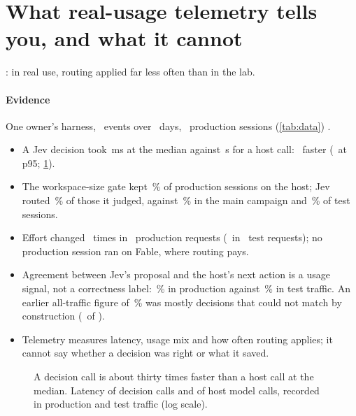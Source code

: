\section{What real-usage telemetry tells you, and what it cannot}\label{sec:telemetry}

\begin{claimbox}
: in real use, routing applied far less often than in the lab.
\end{claimbox}

\paragraph{Evidence} One owner's harness, \ObEvents\ events over \ObDays\ days, \ObProdSessions\ production sessions
(\cref{tab:data}) \expl.
\begin{itemize}[leftmargin=1.2em]
  \item A Jev decision took \ObJevPfifty\,ms at the median against \ObHostPfifty\,s for a host call: \ObJevHostXFifty\X\
    faster (\ObJevHostXNinetyfive\X\ at p95; \cref{fig:latency}).
  \item The workspace-size gate kept \ObStScopePct\,\% of production sessions on the host; Jev routed \ObJevRouteProd\,\%
    of those it judged, against \AoFableJevRoute\,\% in the main campaign and \ObJevRouteTest\,\% of test sessions.
  \item Effort changed \ObEffSwitchProd\ times in \ObEffReqProd\ production requests (\ObEffSwitchTest\ in \ObEffReqTest\
    test requests); no production session ran on Fable, where routing pays.
  \item Agreement between Jev's proposal and the host's next action is a usage signal, not a correctness label:
    \ObProdRate\,\% in production against \ObTestRate\,\% in test traffic. An earlier all-traffic figure of \ObAllRate\,\%
    was mostly decisions that could not match by construction (\ObUnmatchN\ of \ObAllN).
  \item Telemetry measures latency, usage mix and how often routing applies; it cannot say whether a decision was right
    or what it saved.
\end{itemize}

\begin{figure}[tbp]
\centering
{}\par\smallskip

\caption{A decision call is about thirty times faster than a host call at the median. Latency of decision calls and of
host model calls, recorded in production and test traffic (log scale).}
\label{fig:latency}
\end{figure}

